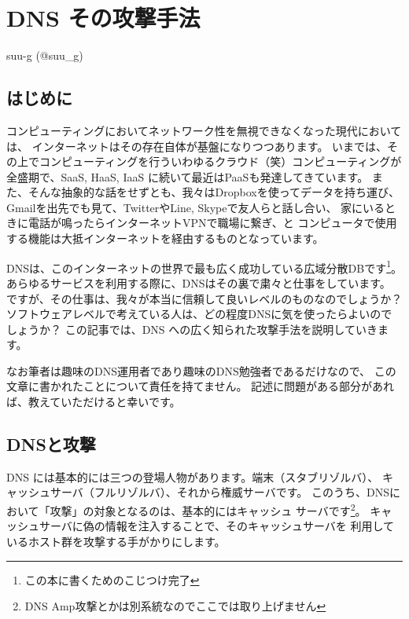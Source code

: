 
\chapter{DNS その攻撃手法}

\begin{flushright}
 {\headfont suu-g (@suu\_g)}
\end{flushright}

\section{はじめに}

コンピューティングにおいてネットワーク性を無視できなくなった現代においては、
インターネットはその存在自体が基盤になりつつあります。
いまでは、その上でコンピューティングを行ういわゆるクラウド（笑）コンピューティングが
全盛期で、SaaS, HaaS, IaaS に続いて最近はPaaSも発達してきています。
また、そんな抽象的な話をせずとも、我々はDropboxを使ってデータを持ち運び、
Gmailを出先でも見て、TwitterやLine, Skypeで友人らと話し合い、
家にいるときに電話が鳴ったらインターネットVPNで職場に繋ぎ、と
コンピュータで使用する機能は大抵インターネットを経由するものとなっています。

DNSは、このインターネットの世界で最も広く成功している広域分散DBです\footnote{この本に書くためのこじつけ完了}。
あらゆるサービスを利用する際に、DNSはその裏で粛々と仕事をしています。
ですが、その仕事は、我々が本当に信頼して良いレベルのものなのでしょうか？
ソフトウェアレベルで考えている人は、どの程度DNSに気を使ったらよいのでしょうか？
この記事では、DNS への広く知られた攻撃手法を説明していきます。

なお筆者は趣味のDNS運用者であり趣味のDNS勉強者であるだけなので、
この文章に書かれたことについて責任を持てません。
記述に問題がある部分があれば、教えていただけると幸いです。

\section{DNSと攻撃}

DNS には基本的には三つの登場人物があります。端末（スタブリゾルバ）、
キャッシュサーバ（フルリゾルバ）、それから権威サーバです。
このうち、DNSにおいて「攻撃」の対象となるのは、基本的にはキャッシュ
サーバです\footnote{DNS Amp攻撃とかは別系統なのでここでは取り上げません}。
キャッシュサーバに偽の情報を注入することで、そのキャッシュサーバを
利用しているホスト群を攻撃する手がかりにします。

